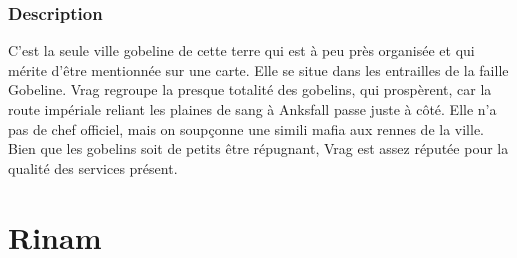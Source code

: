 \subsubsection{Description}
\hypertarget{vrag}{}C’est la seule ville gobeline de cette terre qui est à peu près organisée et qui mérite d’être mentionnée sur une carte. Elle se situe dans les entrailles de la faille Gobeline. Vrag regroupe la presque totalité des gobelins, qui prospèrent, car la route impériale reliant les plaines de sang à Anksfall passe juste à côté. Elle n’a pas de chef officiel, mais on soupçonne une simili mafia aux rennes de la ville. Bien que les gobelins soit de petits être répugnant, Vrag est assez réputée pour la qualité des services présent.
\section{Rinam}
